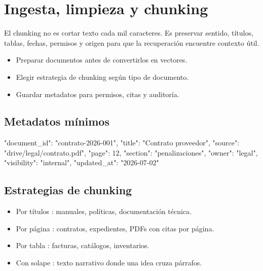 \documentclass[11pt,a4paper]{book}
\begin{document}
\chapter{Ingesta, limpieza y chunking}
El chunking no es cortar texto cada mil caracteres. Es preservar sentido, títulos, tablas, fechas, permisos y origen para que la recuperación encuentre contexto útil.

\begin{itemize}\item Preparar documentos antes de convertirlos en vectores.\end{itemize}
\begin{itemize}\item Elegir estrategia de chunking según tipo de documento.\end{itemize}
\begin{itemize}\item Guardar metadatos para permisos, citas y auditoría.\end{itemize}
\section{Metadatos mínimos}
\begin{codebox}
{
  "document_id": "contrato-2026-001",
  "title": "Contrato proveedor",
  "source": "drive/legal/contrato.pdf",
  "page": 12,
  "section": "penalizaciones",
  "owner": "legal",
  "visibility": "internal",
  "updated_at": "2026-07-02"
}
\end{codebox}
\section{Estrategias de chunking}
\begin{itemize}\item Por títulos : manuales, políticas, documentación técnica.\end{itemize}
\begin{itemize}\item Por página : contratos, expedientes, PDFs con citas por página.\end{itemize}
\begin{itemize}\item Por tabla : facturas, catálogos, inventarios.\end{itemize}
\begin{itemize}\item Con solape : texto narrativo donde una idea cruza párrafos.\end{itemize}
\end{document}
